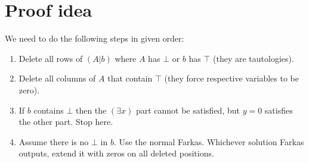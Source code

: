 \documentclass[]{article}
\begin{document}
\section{Proof idea}

We need to do the following steps in given order:
\begin{enumerate}
\item Delete all rows of $(A|b)$ where $A$ has $\bot$ or $b$ has $\top$
(they are tautologies).
\item Delete all columns of $A$ that contain $\top$
(they force respective variables to be zero).
\item If $b$ contains $\bot$ then the $(\exists x)$ part cannot be satisfied,
but $y = 0$ satisfies the other part. Stop here.
\item Assume there is no $\bot$ in $b$. Use the normal Farkas.
Whichever solution Farkas outputs, extend it with zeros on
all deleted positions.
\end{enumerate}
\end{document}
